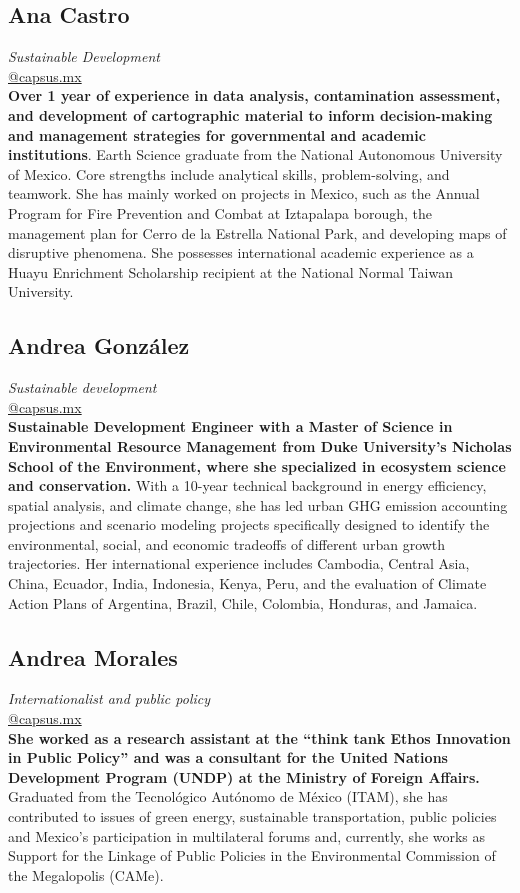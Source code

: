 \documentclass[
	a4paper,
	12pt,
	unnumberedsections,
]{CSSullivanBusinessReport}
\begin{document}
\subsection*{Ana Castro}
\textit{Sustainable Development} \\
\href{mailto:@capsus.mx}{@capsus.mx} \\[0.5em]
\textbf{Over 1 year of experience in data analysis, contamination assessment, and development of cartographic material to inform decision-making and management strategies for governmental and academic institutions}. Earth Science graduate from the National Autonomous University of Mexico. Core strengths include analytical skills, problem-solving, and teamwork. She has mainly worked on projects in Mexico, such as the Annual Program for Fire Prevention and Combat at Iztapalapa borough, the management plan for Cerro de la Estrella National Park, and developing maps of disruptive phenomena. She possesses international academic experience as a Huayu Enrichment Scholarship recipient at the National Normal Taiwan University.

\subsection*{Andrea González}
\textit{Sustainable development} \\
\href{mailto:@capsus.mx}{@capsus.mx} \\[0.5em]
\textbf{Sustainable Development Engineer with a Master of Science in Environmental Resource Management from Duke University’s Nicholas School of the Environment, where she specialized in ecosystem science and conservation.} With a 10-year technical background in energy efficiency, spatial analysis, and climate change, she has led urban GHG emission accounting projections and scenario modeling projects specifically designed to identify the environmental, social, and economic tradeoffs of different urban growth trajectories. Her international experience includes Cambodia, Central Asia, China, Ecuador, India, Indonesia, Kenya, Peru, and the evaluation of Climate Action Plans of Argentina, Brazil, Chile, Colombia, Honduras, and Jamaica.

\subsection*{Andrea Morales}
\textit{Internationalist and public policy} \\
\href{mailto:@capsus.mx}{@capsus.mx} \\[0.5em]
\textbf{She worked as a research assistant at the “think tank Ethos Innovation in Public Policy” and was a consultant for the United Nations Development Program (UNDP) at the Ministry of Foreign Affairs.} Graduated from the Tecnológico Autónomo de México (ITAM), she has contributed to issues of green energy, sustainable transportation, public policies and Mexico's participation in multilateral forums and, currently, she works as Support for the Linkage of Public Policies in the Environmental Commission of the Megalopolis (CAMe).
\end{document}
